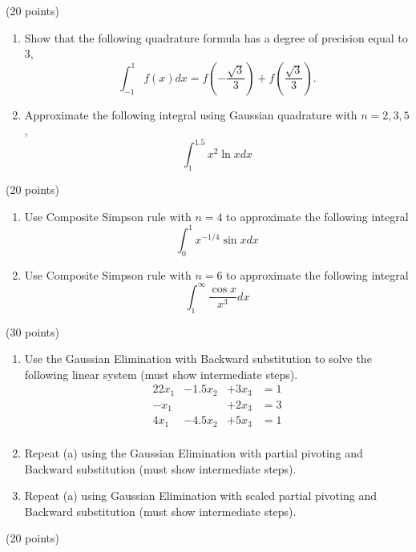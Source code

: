 \documentclass[10pt]{jhwhw}
\begin{document}
\solution

\problem{} (20 points)

	\begin{enumerate}
		\item Show that the following quadrature formula has a degree of precision equal to 3,
			$$
				\int_{-1}^{1} f(x) dx = f(-\frac{\sqrt{3}}{3}) + f(\frac{\sqrt{3}}{3}).
			$$
		\item Approximate the following integral using Gaussian quadrature with $n= 2,3,5$,
			$$
				\int_1^{1.5} x^2 \ln x dx
			$$
	\end{enumerate}

\solution

\problem{} (20 points)

	\begin{enumerate}
		\item Use Composite Simpson rule with $n=4$ to approximate the following integral
			$$
				\int_0^1 x^{-1/4} \sin xdx
			$$
		\item Use Composite Simpson rule with $n=6$ to approximate the following integral
			$$
				\int_1^{\infty} \frac{\cos x}{x^3} dx
			$$
	\end{enumerate}

\solution

\problem{} (30 points)

	\begin{enumerate}
		\item Use the Gaussian Elimination with Backward substitution to solve the following
			linear system (must show intermediate steps).
			\begin{alignat*}{2}
				2x_1 &- 1.5x_2 &+ 3x_3 &= 1 \\
				-x_1 &         &+ 2x_3 &= 3 \\
				4x_1 &- 4.5x_2 &+ 5x_3 &= 1 \\
			\end{alignat*}
		\item Repeat (a) using the Gaussian Elimination with partial pivoting and Backward
			substitution (must show intermediate steps).
		\item Repeat (a) using Gaussian Elimination with scaled partial pivoting and 
			Backward substitution (must show intermediate steps).
	\end{enumerate}

\solution

\problem{} (20 points)
\end{document}
